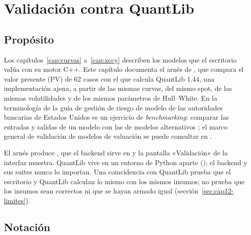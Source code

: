 \chapter{Validación contra QuantLib}\label{cap:validacion}

\section{Propósito}\label{sec:cap12-proposito}

Los capítulos~\ref{cap:curvas} a~\ref{cap:xccy} describen los modelos que el escritorio valúa con su motor C++.
Este capítulo documenta el arnés de ,
que compara el valor presente (PV) de 62 casos con el que calcula QuantLib 1.44, una implementación ajena,
a partir de las mismas curvas, del mismo spot, de las mismas volatilidades y de los mismos parámetros de
Hull--White. En la terminología de la guía de gestión de riesgo de modelo de las autoridades bancarias de Estados Unidos es un
ejercicio de \emph{benchmarking}: comparar las entradas y salidas de un modelo con las de modelos alternativos
\citep{fed2011}; el marco general de validación de modelos de valuación se puede consultar en \citet{morini2011}.

El arnés produce , que el backend sirve en
 y la pantalla «Validación» de la interfaz muestra. QuantLib vive
en un entorno de Python aparte (); el backend y sus suites
nunca lo importan. Una coincidencia con QuantLib prueba que el escritorio y QuantLib calculan lo mismo con los mismos
insumos; no prueba que los insumos sean correctos ni que se hayan armado igual (sección~\ref{sec:cap12-limites}).

\section{Notación}\label{sec:cap12-notacion}

